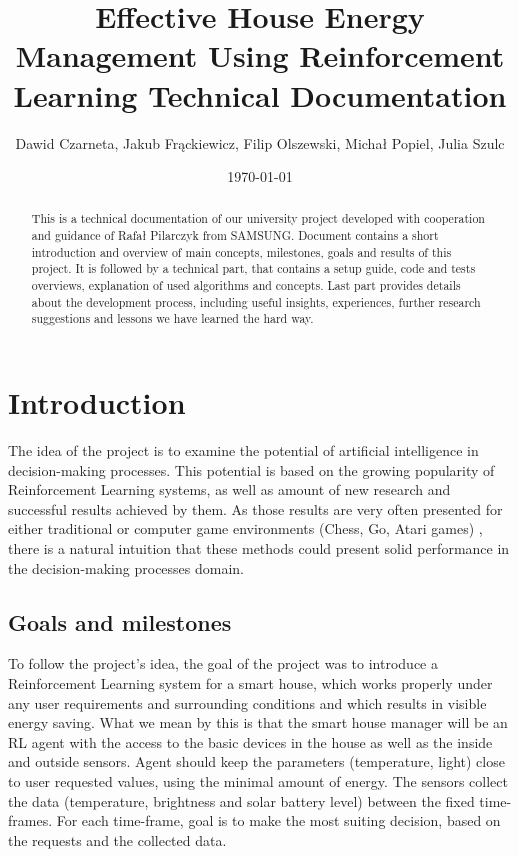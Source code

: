 \documentclass{article}
\title{Effective House Energy Management Using Reinforcement Learning Technical Documentation} %
\author{Dawid Czarneta, Jakub Frąckiewicz, Filip Olszewski, Michał Popiel, Julia Szulc}
\date{\today}
\begin{document}
\maketitle

\begin{abstract}
This is a technical documentation of our university project developed with cooperation and guidance of Rafał Pilarczyk from SAMSUNG. Document contains a short introduction and overview of main concepts, milestones, goals and results of this project. It is followed by a technical part, that contains a setup guide, code and tests overviews, explanation of used algorithms and concepts. Last part provides details about the development process, including useful insights, experiences, further research suggestions and lessons we have learned the hard way.
\end{abstract}

\newpage
\tableofcontents
\newpage

\section{Introduction}
The idea of the project is to examine the potential of artificial intelligence in decision-making processes. This potential is based on the growing popularity of Reinforcement Learning systems, as well as amount of new research and successful results achieved by them. As those results are very often presented for either traditional or computer game environments (Chess, Go, Atari games) \cite{dqn_paper}, there is a natural intuition that these methods could present solid performance in the decision-making processes domain.


\subsection{Goals and milestones}
To follow the project's idea, the goal of the project was to introduce a Reinforcement Learning system for a smart house, which works properly under any user requirements and surrounding conditions and which results in visible energy saving. What we mean by this is that the smart house manager will be an RL agent with the access to the basic devices in the house as well as the inside and outside sensors. Agent should keep the parameters (temperature, light) close to user requested values, using the minimal amount of energy. The sensors collect the data (temperature, brightness and solar battery level) between the fixed time-frames. For each time-frame, goal is to make the most suiting decision, based on the requests and the collected data.
\end{document}
